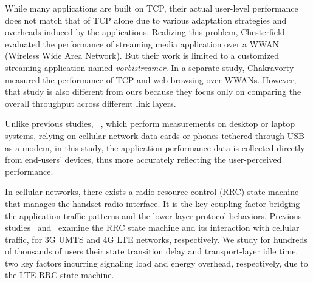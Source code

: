 While many applications are built on TCP, their actual user-level performance does not match that of TCP alone due to various adaptation strategies and overheads induced by the applications. Realizing this problem, Chesterfield \etal~\cite{Chesterfield:3GMultimedia:Monet2004} evaluated the performance of streaming media application over a WWAN (Wireless Wide Area Network). But their work is limited to a customized streaming application named {\em vorbistreamer}. In a separate study, Chakravorty \etal~\cite{Chakravorty:WWAN:Mobicom2004} measured the performance of TCP and web browsing over WWANs. However, that study is also different from ours because they focus only on comparing the overall throughput across different link layers.

Unlike previous studies, \eg~\cite{Liu:3GChannelAppl:Mobicom2008, Chakravorty:WWAN:Mobicom2004, Jang:3G:MICNET2009}, which perform measurements on desktop or laptop systems, relying on cellular network data cards or phones tethered through USB as a modem, in this study, the application performance data is collected directly from end-users' devices, thus more accurately reflecting the user-perceived performance.

In cellular networks, there exists a radio resource control (RRC) state machine that manages the handset radio interface. It is the key coupling factor bridging the application traffic patterns and the lower-layer protocol behaviors. Previous studies~\cite{imc.3g} and~\cite{huang_mobisys12} examine the RRC state machine and its interaction with cellular traffic, for 3G UMTS and 4G LTE networks, respectively. We study for hundreds of thousands of users their state transition delay and transport-layer idle time, two key factors incurring signaling load and energy overhead, respectively, due to the LTE RRC state machine.

